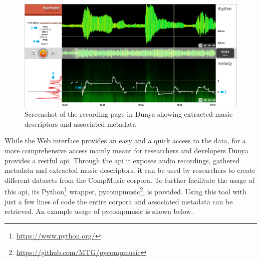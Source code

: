 \begin{figure}
	\begin{center}
		\includegraphics[width=\figSizeHundred]{ch08_applications/figures/dunyaScreenshot.pdf}
		\end{center}
		\caption{Screenshot of the recording page in Dunya showing extracted music descriptors and associated metadata}
		\label{fig:dunya_recording}
\end{figure}

While the Web interface provides an easy and a quick access to the data, for a more comprehensive access mainly meant for researchers and developers Dunya provides a restful \gls{api}. Through the \gls{api} it exposes audio recordings, gathered metadata and extracted music descriptors. it can be used by researchers to create different datasets from the CompMusic corpora. To further facilitate the usage of this \gls{api}, its Python\footnote{\url{https://www.python.org/}} wrapper, \gls{pycompmusic}\footnote{\url{https://github.com/MTG/pycompmusic}}, is provided. Using this tool with just a few lines of code the entire corpora and associated metadata can be retrieved. An example usage of \gls{pycompmusic} is shown below.

%
%
%
%
%

